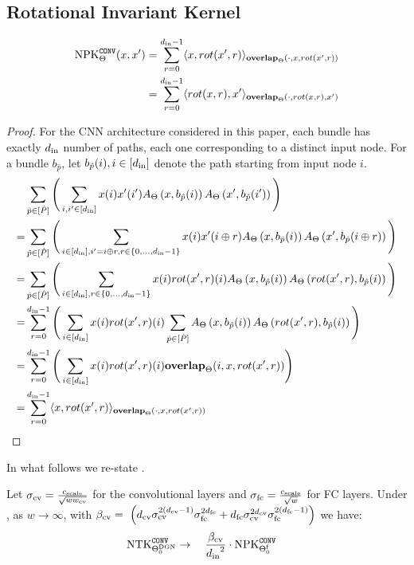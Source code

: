 \subsection{Rotational Invariant Kernel}
\begin{lemma}\label{lm:cnnnpk}
\begin{align*}
\text{NPK}^{\texttt{CONV}}_{\Theta}(x,x')&=\sum_{r=0}^{d_{\text{in}}-1} \langle x,rot(x',r)\rangle_{\textbf{overlap}_{\Theta}(\cdot, x,rot(x',r))}\\&=\sum_{r=0}^{d_{\text{in}}-1} \langle rot(x,r),x'\rangle_{\textbf{overlap}_{\Theta}(\cdot, rot(x,r),x')}
\end{align*}
\end{lemma}

\begin{proof}
For the CNN architecture considered in this paper, each bundle has exactly $d_{\text{in}}$ number of paths, each one corresponding to a distinct input node. For a bundle $b_{\hat{p}}$, let $b_{\hat{p}}(i),i\in[d_{\text{in}}]$ denote the path starting from input node $i$.
\begin{align*}
&\sum_{\hat{p}\in [\hat{P}]} \Bigg(\sum_{i,i'\in[d_{\text{in}}]} x(i) x'(i') A_{\Theta}\left(x,b_{\hat{p}}(i)\right) A_{\Theta}\left(x',b_{\hat{p}}(i')\right) \Bigg)\\
=&\sum_{\hat{p}\in [\hat{P}]}\Bigg(\sum_{i\in[d_{\text{in}}],i'=i\oplus r, r\in\{0,\ldots,d_{\text{in}}-1\}} x(i) x'(i\oplus r) A_{\Theta}\left(x,b_{\hat{p}}(i)\right) A_{\Theta}\left(x',b_{\hat{p}}(i\oplus r)\right)\Bigg)\\
=&\sum_{\hat{p}\in [\hat{P}]}\Bigg(\sum_{i\in[d_{\text{in}}], r\in\{0,\ldots,d_{\text{in}}-1\}} x(i) rot(x',r)(i) A_{\Theta}\left(x,b_{\hat{p}}(i)\right) A_{\Theta}\left(rot(x',r),b_{\hat{p}}(i)\right)\Bigg)\\
=&\sum_{r=0}^{d_{\text{in}}-1} \Bigg(\sum_{i\in[d_{\text{in}}]} x(i) rot(x',r)(i) \sum_{\hat{p}\in [\hat{P}]}  A_{\Theta}\left(x,b_{\hat{p}}(i)\right) A_{\Theta}\left(rot(x',r),b_{\hat{p}}(i)\right)\Bigg)\\
=&\sum_{r=0}^{d_{\text{in}}-1}\Bigg(\sum_{i\in[d_{\text{in}}]} x(i) rot(x',r)(i) \textbf{overlap}_{\Theta}(i,x,rot(x',r))\Bigg)\\
=&\sum_{r=0}^{d_{\text{in}}-1} \langle x,rot(x',r)\rangle_{\textbf{overlap}_{\Theta}(\cdot,x,rot(x',r))}
\end{align*}
\end{proof}


In what follows we re-state .

\begin{theorem} Let $\sigma_{\text{cv}}=\frac{c_{\text{scale}}}{\sqrt{ww_{\text{cv}}}}$ for the convolutional layers and $\sigma_{\text{fc}}=\frac{c_{\text{scale}}}{\sqrt{w}}$ for FC layers. Under , as $w\rightarrow\infty$, with  $\beta_{\text{cv}} = \ \left(d_{\text{cv}} \sigma_{\text{cv}}^{2(d_{\text{cv}}-1)}\sigma_{\text{fc}}^{2d_{\text{fc}}}+d_{\text{fc}} \sigma_{\text{cv}}^{2d_{\text{cv}}}\sigma_{\text{fc}}^{2(d_{\text{fc}}-1)}\right)$ we have:
\begin{align*}
&\text{NTK}^{\texttt{CONV}}_{\Theta^{\text{DGN}}_0}\rightarrow\quad \frac{\beta_{\text{cv}}}{{d_{\text{in}}}^2} \cdot \text{NPK}^{\texttt{CONV}}_{\Theta^{\textrm{f}}_0}
\end{align*}
\end{theorem}

